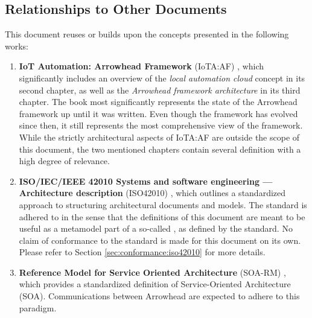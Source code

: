\subsection{Relationships to Other Documents}
\label{sec:introduction:relationships}

This document reuses or builds upon the concepts presented in the following works:

\begin{enumerate}

\item \textbf{IoT Automation: Arrowhead Framework} (IoTA:AF) \cite{delsing2017iot}, which significantly includes an overview of the \textit{local automation cloud} concept in its second chapter, as well as the \textit{Arrowhead framework architecture} in its third chapter.
The book most significantly represents the state of the Arrowhead framework up until it was written.
Even though the framework has evolved since then, it still represents the most comprehensive view of the framework.
While the strictly architectural aspects of IoTA:AF are outside the scope of this document, the two mentioned chapters contain several definition with a high degree of relevance.

\item \textbf{ISO/IEC/IEEE 42010 Systems and software engineering — Architecture description} (ISO42010) \cite{iso42010}, which outlines a standardized approach to structuring architectural documents and models.
The standard is adhered to in the sense that the definitions of this document are meant to be useful as a metamodel part of a so-called , as defined by the standard.
No claim of conformance to the standard is made for this document on its own.
Please refer to Section \ref{sec:conformance:iso42010} for more details.

\item \textbf{Reference Model for Service Oriented Architecture} (SOA-RM) \cite{mackenzie2006reference}, which provides a standardized definition of Service-Oriented Architecture (SOA).
Communications between Arrowhead  are expected to adhere to this paradigm.


\end{enumerate}
